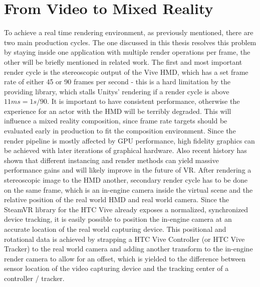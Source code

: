 %
\chapter{From Video to Mixed Reality}
\label{chap:video2mr}


To achieve a real time rendering environment, as previously mentioned, there 
are two main production cycles. The one discussed in this thesis resolves this 
problem by staying inside one application with multiple render operations per 
frame, the other will be briefly mentioned in related work. 
\newline
The first and most important render cycle is the stereoscopic output of the 
Vive HMD, which has a set frame rate of either 45 or 90 frames per second - 
this is a hard limitation by the providing library, which stalls Unitys' 
rendering if a render cycle is above $11ms = 1s / 90$. It is important to have 
consistent performance, otherwise the experience for an actor with the HMD will 
be terribly degraded. This will influence a mixed reality composition, since 
frame rate targets should be evaluated early in production to fit the 
composition environment. Since the render pipeline is mostly affected by GPU 
performance, high fidelity graphics can be achieved with later iterations of 
graphical hardware. Also recent history has shown that different instancing and 
render methods can yield massive performance gains and will likely improve in 
the future of VR\cite{oculus:improv-render:2016}.
\newline
After rendering a stereoscopic image to the HMD another, secondary render cycle 
has to be done on the same frame, which is an in-engine camera inside the 
virtual scene and the relative position of the real world HMD and real world 
camera. Since the SteamVR library for the HTC Vive already exposes a 
normalized, synchronized device tracking, it is easily possible to position the 
in-engine camera at an accurate location of the real world capturing device. 
This positional and rotational data is achieved by strapping a HTC Vive 
Controller (or HTC Vive Tracker) to the real world camera and adding another 
transform to the in-engine render camera to allow for an offset, which is 
yielded to the difference between sensor location of the video capturing device 
and the tracking center of a controller / tracker.

